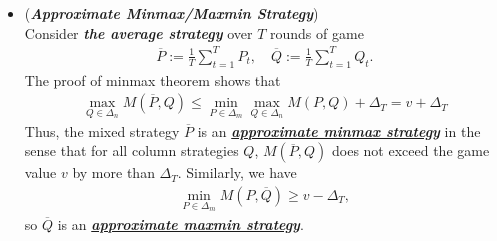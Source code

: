 \documentclass[11pt]{article}
\begin{document}
\begin{itemize}
\item \begin{remark}(\textbf{\emph{Approximate Minmax/Maxmin Strategy}}) \\
Consider \emph{\textbf{the average strategy}} over $T$ rounds of game
\begin{align*}
\overline{P} := \frac{1}{T}\sum_{t=1}^{T}P_t, \quad \overline{	Q} := \frac{1}{T}\sum_{t=1}^{T}Q_t.
\end{align*} The proof of minmax theorem shows that
\begin{align*}
\max_{Q \in \Delta_{n}}M(\overline{P}, Q) \le \min_{P \in \Delta_{m}}\max_{Q \in \Delta_{n}}M(P, Q) + \Delta_{T} = v + \Delta_{T}
\end{align*} Thus, the mixed strategy $\overline{P}$ is an \underline{\emph{\textbf{approximate minmax strategy}}} in the sense that for all column strategies $Q$, $M(\overline{P}, Q)$ does not exceed the game value $v$ by more than $ \Delta_{T}$.  Similarly, we have
\begin{align*}
\min_{P \in \Delta_{m}}M(P, \overline{	Q} ) \ge v - \Delta_{T},
\end{align*} so $\overline{Q}$ is an \underline{\emph{\textbf{approximate maxmin strategy}}}.
\end{remark}
\end{itemize}
\end{document}
